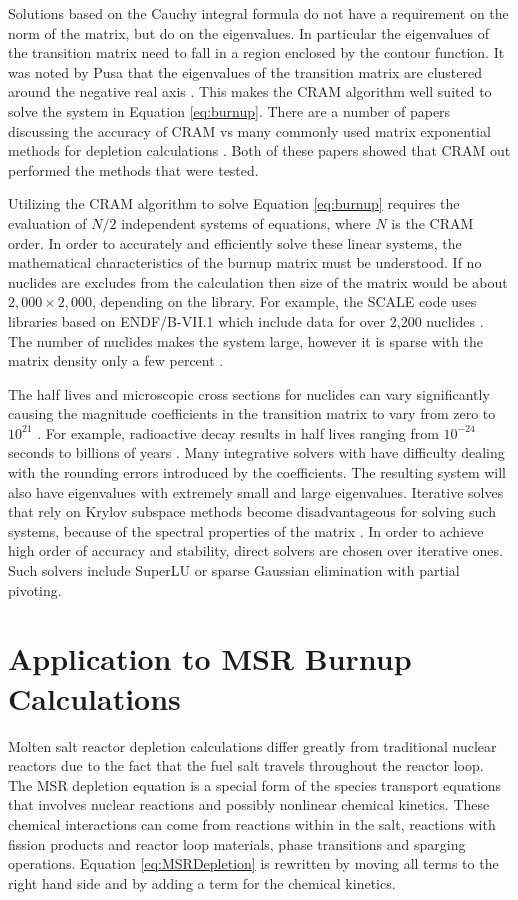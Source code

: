 Solutions based on the Cauchy integral formula do not have a requirement on the norm of the matrix, but do on the eigenvalues. In particular the eigenvalues of the transition matrix need to fall in a region enclosed by the contour function. It was noted by Pusa that the eigenvalues of the transition matrix are clustered around the negative real axis \cite{pusa2010}. This makes the CRAM algorithm well suited to solve the system in Equation \ref{eq:burnup}. There are a number of papers discussing the accuracy of CRAM vs many commonly used matrix exponential methods for depletion calculations \cite{isotalo2011} \cite{pusa2010}. Both of these papers showed that CRAM out performed the methods that were tested.

Utilizing the CRAM algorithm to solve Equation \ref{eq:burnup} requires the evaluation of $N/2$ independent systems of equations, where $N$ is the CRAM order. In order to accurately and efficiently solve these linear systems, the mathematical characteristics of the burnup matrix must be understood. If no nuclides are excludes from the calculation then size of the matrix would be about $2,000 \times 2,000$, depending on the library. For example, the SCALE code uses libraries based on ENDF/B-VII.1 which include data for over 2,200 nuclides \cite{scaleManual}. The number of nuclides makes the system large, however it is sparse with the matrix density only a few percent \cite{pusa2013}. 

The half lives and microscopic cross sections for nuclides can vary significantly causing the magnitude coefficients in the transition matrix to vary from zero to $10^{21}$ \cite{pusa2013}. For example, radioactive decay results in half lives ranging from $10^{-24}$ seconds to billions of years \cite{pusaThesis}. Many integrative solvers with have difficulty dealing with the rounding errors introduced by the coefficients. The resulting system will also have eigenvalues with extremely small and large eigenvalues. Iterative solves that rely on Krylov subspace methods become disadvantageous for solving such systems, because of the spectral properties of the matrix \cite{pusa2013}. In order to achieve high order of accuracy and stability, direct solvers are chosen over iterative ones. Such solvers include SuperLU or sparse Gaussian elimination with partial pivoting.

\section{Application to MSR Burnup Calculations}
Molten salt reactor depletion calculations differ greatly from traditional nuclear reactors due to the fact that the fuel salt travels throughout the reactor loop. The MSR depletion equation is a special form of the species transport equations that involves nuclear reactions and possibly nonlinear chemical kinetics. These chemical interactions can come from reactions within in the salt, reactions with fission products and reactor loop materials, phase transitions and sparging operations. Equation \ref{eq:MSRDepletion} is rewritten by moving all terms to the right hand side and by adding a term for the chemical kinetics.

